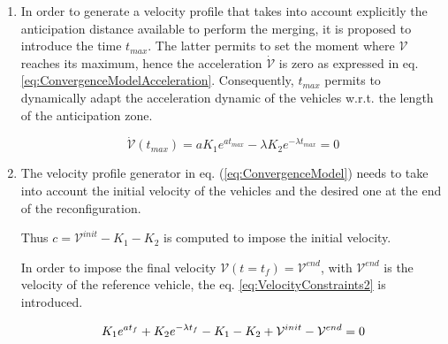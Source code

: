 \begin{enumerate}
 
    \item In order to generate a velocity profile that takes into account explicitly the anticipation distance available to perform the merging, it is proposed to introduce the time $t_{max}$. The latter permits to set the moment where ${\mathcal{V}}$ reaches its maximum, hence the acceleration $\dot{\mathcal{V}}$ is zero as expressed in eq. \ref{eq:ConvergenceModelAcceleration}. Consequently, $t_{max}$ permits to dynamically adapt the acceleration dynamic of the vehicles w.r.t. the length of the anticipation zone. 
 

 

\begin{equation} \label{eq:ConvergenceModelAcceleration}
    \dot{\mathcal{V}}(t_{max}) = aK_1 e^{a t_{max} } -\lambda  K_2 e^{-\lambda t_{max} }  = 0
\end{equation}


\item  The velocity profile generator in eq. (\ref{eq:ConvergenceModel}) needs to take into account the initial velocity of the vehicles and the desired one at the end of the reconfiguration. 

Thus $c=\mathcal{V}^{init} - K_1 -K_2 $ is computed to impose the initial velocity.


In order to impose the final velocity $\mathcal{V}(t=t_f)=\mathcal{V}^{end}$, with $\mathcal{V}^{end}$ is the velocity of the reference vehicle, the eq. \ref{eq:VelocityConstraints2} is introduced.

\begin{equation} \label{eq:VelocityConstraints2}
     K_1 e^{a t_{f} } + K_2 e^{-\lambda t_{f} }  - K_1 -K_2  +\mathcal{V}^{init} -\mathcal{V}^{end}= 0\\
\end{equation}


\end{enumerate}

